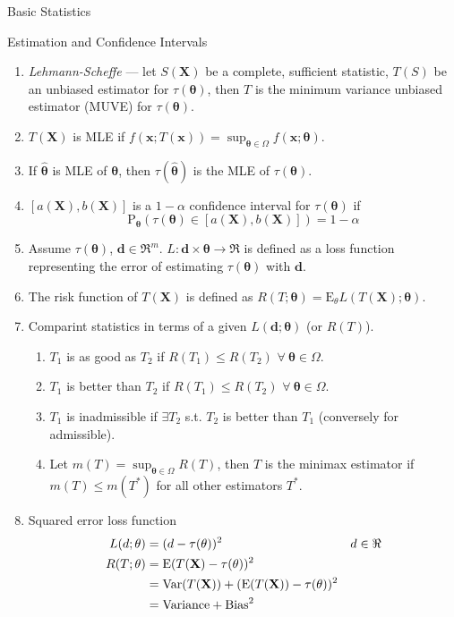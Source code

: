 \documentclass{article}
\newcommand{\E}{\mathrm{E}}
\newcommand{\bx}{\mathbf{x}}
\newcommand{\bX}{\mathbf{X}}
\newcommand{\btheta}{\mathbf{\theta}}
\begin{document}
\begin{section}{Basic Statistics}
\begin{subsection}{Estimation and Confidence Intervals}
\begin{enumerate}
\item \emph{Lehmann-Scheffe} --- let $S(\bX)$ be a complete, sufficient
  statistic, $T(S)$ be an unbiased estimator for $\tau(\btheta)$, then
  $T$ is the minimum variance unbiased estimator (MUVE) for $\tau(\btheta)$.
\item $T(\bX)$ is MLE if $f(\bx; T(\bx)) = \sup_{\btheta \in \Omega}
  f(\bx; \btheta)$.
\item If $\hat{\btheta}$ is MLE of $\btheta$, then $\tau(\hat{\btheta})$ is
  the MLE of $\tau(\btheta)$.
\item $[a(\bX), b(\bX)]$ is a $1 - \alpha$ confidence interval for 
  $\tau(\btheta)$ if 
  \[\mathrm{P}_{\btheta}(\tau(\btheta) \in [a(\bX), b(\bX)]) = 1 - \alpha \]
\item Assume $\tau(\btheta)$, $\mathbf{d} \in \Re^{m}$. $L : \mathbf{d} \times
  \btheta \to \Re$ is defined as a loss function representing the error
  of estimating $\tau(\btheta)$ with $\mathbf{d}$.
\item The risk function of $T(\bX)$ is defined as $R(T; \btheta) =
  \E_{\theta} L(T(\bX); \btheta)$.
\item Comparint statistics in terms of a given $L(\mathbf{d}; \btheta)$
  (or $R(T)$).
  \begin{enumerate}
  \item $T_{1}$ is as good as $T_{2}$ if $R(T_{1}) \leq R(T_{2})$ 
  $\forall\ \btheta \in \Omega$.
  \item $T_{1}$ is better than $T_{2}$ if $R(T_{1}) \leq R(T_{2})$
  $\forall\ \btheta \in \Omega$.
  \item $T_{1}$ is inadmissible if $\exists T_{2}$ s.t. $T_{2}$ is better
  than $T_{1}$ (conversely for admissible).
  \item Let $m(T) = \sup_{\btheta \in \Omega} R(T)$, then $T$ is the minimax 
  estimator if $m(T) \leq m(T^{*})$ for all other estimators $T^{*}$.
  \end{enumerate}
\item Squared error loss function
  \begin{align}
  L(d;\btheta) & = (d - \tau(\btheta))^2 && d \in \Re \notag\\
  R(T;\btheta) & = \E(T(\bX) - \tau(\btheta))^2 \notag\\
   & = \mathrm{Var}(T(\bX)) + (\E(T(\bX)) - \tau(\btheta))^2 \notag\\
   & = \mathrm{Variance} + \mathrm{Bias}^2 \notag

\end{align}
\end{enumerate}
\end{subsection}
\end{section}
\end{document}
